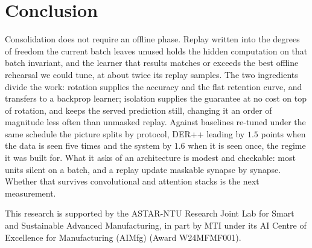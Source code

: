 \documentclass{article}
\begin{document}
\section{Conclusion}
\label{sec:conclusion}

Consolidation does not require an offline phase. Replay written into the degrees of freedom
the current batch leaves unused holds the hidden computation on that batch invariant, and the
learner that results matches or exceeds the best offline rehearsal we could tune, at about
twice its replay samples. The two ingredients divide the work: rotation supplies the accuracy
and the flat retention curve, and transfers to a backprop learner; isolation supplies the
guarantee at no cost on top of rotation, and keeps the served prediction still, changing it an
order of magnitude less often than unmasked replay. Against baselines re-tuned under the same
schedule the picture splits by protocol, DER++ leading by $1.5$ points when the data is seen
five times and the system by $1.6$ when it is seen once, the regime it was built for. What it
asks of an architecture is modest and checkable: most units silent on a batch, and a replay
update maskable synapse by synapse. Whether that survives convolutional and attention stacks
is the next measurement.

\clearpage
\begin{ack}
This research is supported by the A\raisebox{0.12ex}{$\star$}STAR-NTU Research Joint Lab for Smart and Sustainable Advanced Manufacturing, in part by MTI
under its AI Centre of Excellence for Manufacturing (AIMfg) (Award W24MFMF001).
\end{ack}
\end{document}
